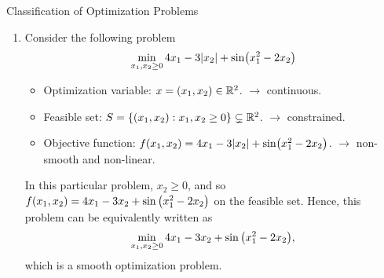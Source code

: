 \begin{eg}{Classification of Optimization Problems}
\begin{enumerate}
		\item Consider the following problem \[\min_{x_1,x_2\geq0}4x_1-3\qty|x_2|+\sin(x_1^2-2x_2)\]
		\begin{sol}
			\begin{itemize}
				\item Optimization variable: $x=(x_1,x_2)\in{\mathbb{R}}^2$. $\longrightarrow$ continuous. 
				\item Feasible set: $S=\qty{(x_1,x_2):x_1,x_2\geq0}\subsetneq{\mathbb{R}}^2$. $\longrightarrow$ constrained.
				\item Objective function: $f(x_1,x_2)=4x_1-3\qty|x_2|+\sin(x_1^2-2x_2)$. $\longrightarrow$ non-smooth and non-linear.
			\end{itemize}	
		\end{sol}
		\begin{rmk}
			In this particular problem, $x_2\geq0$, and so $f(x_1,x_2)=4x_1-3x_2+\sin\qty(x_1^2-2x_2)$ on the feasible set. Hence, this problem can be equivalently written as \[\min_{x_1,x_2\geq0}4x_1-3x_2+\sin\qty(x_1^2-2x_2),\] which is a smooth optimization problem. 
		\end{rmk}
	\end{enumerate}
\end{eg}

